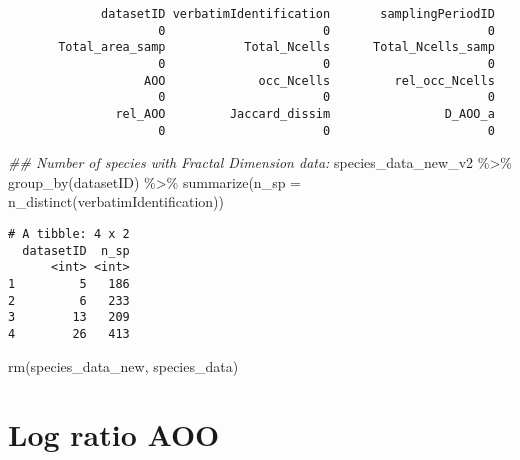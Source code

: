 \documentclass[
  letterpaper,
  DIV=11,
  numbers=noendperiod]{scrreprt}
\newenvironment{Shaded}{\begin{snugshade}}{\end{snugshade}}
\newcommand{\AttributeTok}[1]{\textcolor[rgb]{0.40,0.45,0.13}{#1}}
\newcommand{\CommentTok}[1]{\textcolor[rgb]{0.37,0.37,0.37}{#1}}
\newcommand{\DocumentationTok}[1]{\textcolor[rgb]{0.37,0.37,0.37}{\textit{#1}}}
\newcommand{\FunctionTok}[1]{\textcolor[rgb]{0.28,0.35,0.67}{#1}}
\newcommand{\NormalTok}[1]{\textcolor[rgb]{0.00,0.23,0.31}{#1}}
\newcommand{\OtherTok}[1]{\textcolor[rgb]{0.00,0.23,0.31}{#1}}
\newcommand{\SpecialCharTok}[1]{\textcolor[rgb]{0.37,0.37,0.37}{#1}}
\begin{document}
\begin{verbatim}
             datasetID verbatimIdentification       samplingPeriodID
                     0                      0                      0
       Total_area_samp           Total_Ncells      Total_Ncells_samp
                     0                      0                      0
                   AOO             occ_Ncells         rel_occ_Ncells
                     0                      0                      0
               rel_AOO         Jaccard_dissim                D_AOO_a
                     0                      0                      0
\end{verbatim}

\begin{Shaded}
\begin{Highlighting}[]
\DocumentationTok{\#\# Number of species with Fractal Dimension data:}
\NormalTok{species\_data\_new\_v2 }\SpecialCharTok{\%\textgreater{}\%}
  \FunctionTok{group\_by}\NormalTok{(datasetID) }\SpecialCharTok{\%\textgreater{}\%}
  \FunctionTok{summarize}\NormalTok{(}\AttributeTok{n\_sp =} \FunctionTok{n\_distinct}\NormalTok{(verbatimIdentification))}
\end{Highlighting}
\end{Shaded}

\begin{verbatim}
# A tibble: 4 x 2
  datasetID  n_sp
      <int> <int>
1         5   186
2         6   233
3        13   209
4        26   413
\end{verbatim}

\begin{Shaded}
\begin{Highlighting}[]
\FunctionTok{rm}\NormalTok{(species\_data\_new, species\_data)}
\end{Highlighting}
\end{Shaded}

\hypertarget{log-ratio-aoo}{%
\section{Log ratio AOO}\label{log-ratio-aoo}}

\begin{Shaded}
\end{Shaded}
\end{document}
